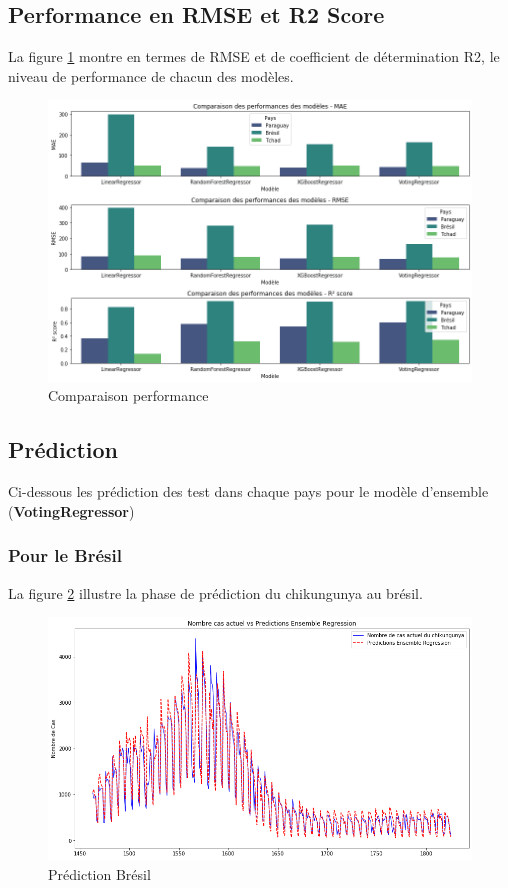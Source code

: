 \subsection{Performance en RMSE et R2 Score}
La figure \ref{fig:metriccomparaison} montre en termes de RMSE et de coefficient de détermination R2, le niveau de performance de chacun des modèles.
\begin{figure}[h!]
	\centering
	\includegraphics[width=0.8\linewidth]{images/metric_comparaison}
	\caption{Comparaison performance}
	\label{fig:metriccomparaison}
\end{figure}
\newpage
\subsection{Prédiction}
Ci-dessous les prédiction des test dans chaque pays pour le modèle d'ensemble (\textbf{VotingRegressor})
\subsubsection{Pour le Brésil}
La figure \ref{fig:predictionbresil} illustre la phase de prédiction du chikungunya au brésil. 
\begin{figure}[h!]
	\centering
	\includegraphics[width=1\linewidth]{images/prediction_bresil}
	\caption{Prédiction Brésil}
	\label{fig:predictionbresil}
\end{figure}


